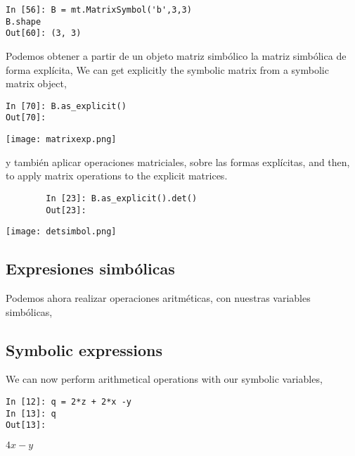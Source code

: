 \begin{center}
	\begin{minipage}{.3\textwidth}
		\begin{verbatim}
In [56]: B = mt.MatrixSymbol('b',3,3)
B.shape
Out[60]: (3, 3)				
		\end{verbatim}
	\end{minipage}
\end{center}
\begin{paracol}{2}
Podemos obtener a partir de un objeto matriz simbólico la matriz simbólica de forma explícita,
\switchcolumn
We can get explicitly the symbolic matrix from a symbolic matrix object,
\end{paracol}
\begin{center}
	\begin{minipage}{.3\textwidth}
\begin{verbatim}
In [70]: B.as_explicit()
Out[70]:				
\end{verbatim}
\texttt{[image: matrixexp.png]}		
	\end{minipage}
\end{center}
\begin{paracol}{2}
y también aplicar operaciones matriciales, sobre las formas explícitas,
\switchcolumn
and then, to apply matrix operations to the explicit matrices.
\end{paracol}
\begin{center}
\begin{minipage}{.8\textwidth}
	\begin{verbatim}
		In [23]: B.as_explicit().det()
		Out[23]:			
	\end{verbatim}
	\texttt{[image: detsimbol.png]}		
\end{minipage}
\end{center}

\begin{paracol}{2}
\subsection{Expresiones simbólicas}
Podemos ahora realizar operaciones aritméticas, con nuestras variables simbólicas,
\switchcolumn
\subsection{Symbolic expressions}
We can now perform arithmetical operations with our symbolic variables,
\end{paracol}
\begin{center}
\begin{minipage}{.5\textwidth}
	\begin{verbatim}
In [12]: q = 2*z + 2*x -y
In [13]: q
Out[13]: 			
	\end{verbatim}
	$4x - y$
\end{minipage}
\end{center}

